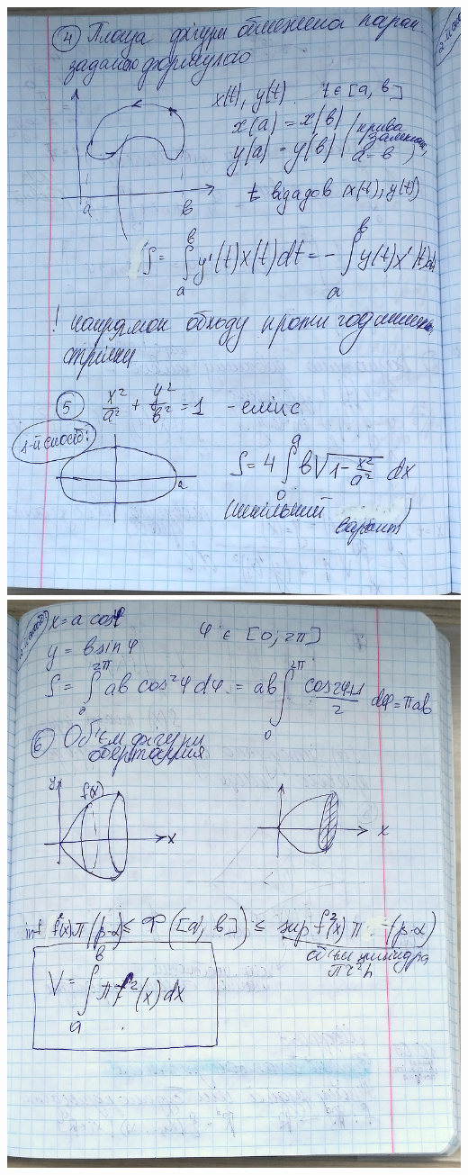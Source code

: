 \documentclass[12pt]{report}
\begin{document}
\includegraphics[scale = 0.2]{image3.jpg}
\includegraphics[scale = 0.2]{image4.jpg}
\end{document}
